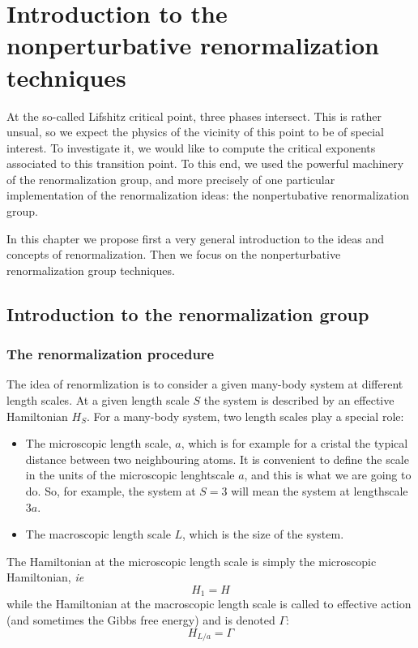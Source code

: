 \chapter{Introduction to the nonperturbative renormalization techniques}

At the so-called Lifshitz critical point, three phases intersect. This is rather unsual, so we expect the physics of the vicinity of this point to be of special interest. To investigate it, we would like to compute the critical exponents associated to this transition point. To this end, we used the powerful machinery of the renormalization group, and more precisely of one particular implementation of the renormalization ideas: the nonpertubative renormalization group.

In this chapter we propose first a very general introduction to the ideas and concepts of renormalization. Then we focus on the nonperturbative renormalization group techniques.

\section{Introduction to the renormalization group}

\subsection{The renormalization procedure}

The idea of renormlization is to consider a given many-body system at different length scales. At a given length scale $S$ the system is described by an effective Hamiltonian $H_S$. 
For a many-body system, two length scales play a special role: 
\begin{itemize}
\item The microscopic length scale, $a$, which is for example for a cristal the typical distance between two neighbouring atoms.
It is convenient to define the scale in the units of the microscopic lenghtscale $a$, and this is what we are going to do. So, for example, the system at $S=3$ will mean the system at lengthscale $3 a$.
\item The macroscopic length scale $L$, which is the size of the system. 
\end{itemize}

The Hamiltonian at the microscopic length scale is simply the microscopic Hamiltonian, \textit{ie}
\begin{equation}
H_1 = H
\end{equation}
 while the Hamiltonian at the macroscopic length scale is called to effective action (and sometimes the Gibbs free energy) and is denoted $\Gamma$:
\begin{equation}
  H_{L/a} = \Gamma
\end{equation} 

